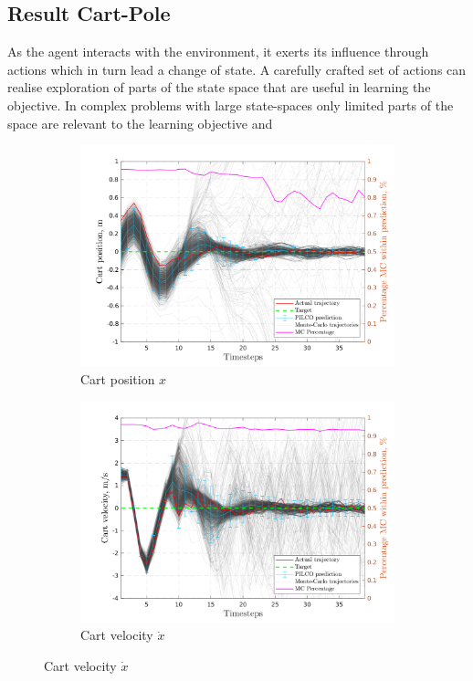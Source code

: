 \subsection{Result Cart-Pole}
As the agent interacts with the environment, it exerts its influence through actions which in turn lead a change of state. A carefully crafted set of actions can realise exploration of parts of the state space that are useful in learning the objective.
 In complex problems with large state-spaces only limited parts of the space are relevant to the learning objective and 
\begin{figure}[htp!]    
  \begin{subfigure}[b]{0.48\linewidth}
    \centering
    \includegraphics[height=0.22\textheight,width=1\textwidth]{Chapter3/Figures/cp_MC_rollout_Ep_15_Dim_1.png} 
    \caption{Cart position $x$} 
    \label{Fig:Re-cp-cart-position} 
  \end{subfigure} 
  \hspace{\fill}  %
  \begin{subfigure}[b]{0.48\linewidth}
    \centering
    \includegraphics[height=0.22\textheight,width=1\textwidth]{Chapter3/Figures/cp_MC_rollout_Ep_15_Dim_2.png} 
    \caption{Cart velocity $\dot x$} 
    \label{Fig:Re-cp-cart-velocity} 
  \end{subfigure} 


\end{figure}
